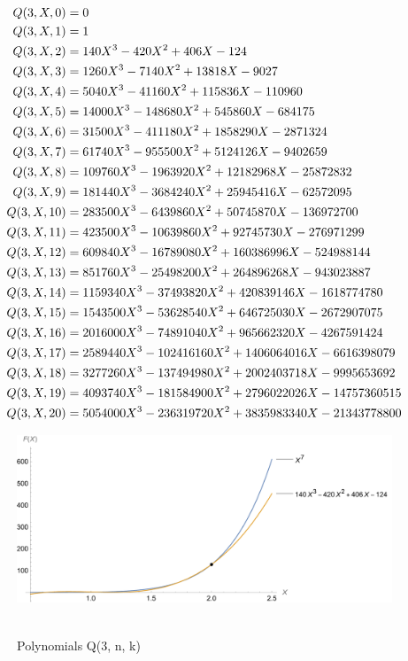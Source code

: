 ﻿\begin{align*}
    {Q}(3,X,0) &= 0 \\
    {Q}(3,X,1) &= 1 \\
    {Q}(3,X,2) &= 140X^3 - 420X^2 + 406X - 124 \\
    {Q}(3,X,3) &= 1260X^3 - 7140X^2 + 13818X - 9027 \\
    {Q}(3,X,4) &= 5040X^3 - 41160X^2 + 115836X - 110960 \\
    {Q}(3,X,5) &= 14000X^3 - 148680X^2 + 545860X - 684175 \\
    {Q}(3,X,6) &= 31500X^3 - 411180X^2 + 1858290X - 2871324 \\
    {Q}(3,X,7) &= 61740X^3 - 955500X^2 + 5124126X - 9402659 \\
    {Q}(3,X,8) &= 109760X^3 - 1963920X^2 + 12182968X - 25872832 \\
    {Q}(3,X,9) &= 181440X^3 - 3684240X^2 + 25945416X - 62572095 \\
    {Q}(3,X,10) &= 283500X^3 - 6439860X^2 + 50745870X - 136972700 \\
    {Q}(3,X,11) &= 423500X^3 - 10639860X^2 + 92745730X - 276971299 \\
    {Q}(3,X,12) &= 609840X^3 - 16789080X^2 + 160386996X - 524988144 \\
    {Q}(3,X,13) &= 851760X^3 - 25498200X^2 + 264896268X - 943023887 \\
    {Q}(3,X,14) &= 1159340X^3 - 37493820X^2 + 420839146X - 1618774780 \\
    {Q}(3,X,15) &= 1543500X^3 - 53628540X^2 + 646725030X - 2672907075 \\
    {Q}(3,X,16) &= 2016000X^3 - 74891040X^2 + 965662320X - 4267591424 \\
    {Q}(3,X,17) &= 2589440X^3 - 102416160X^2 + 1406064016X - 6616398079 \\
    {Q}(3,X,18) &= 3277260X^3 - 137494980X^2 + 2002403718X - 9995653692 \\
    {Q}(3,X,19) &= 4093740X^3 - 181584900X^2 + 2796022026X - 14757360515 \\
    {Q}(3,X,20) &= 5054000X^3 - 236319720X^2 + 3835983340X - 21343778800
\end{align*}
\begin{figure}[H]
    \centering
    \includegraphics[width=1\textwidth]{sections/images/06_seventh_power_with_q_3_n_k}
    ~\caption{Polynomials Q(3, n, k)}\label{fig:figure6}
\end{figure}
